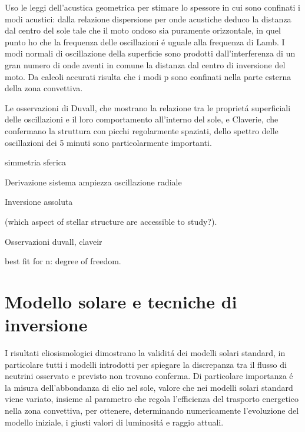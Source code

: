 \documentclass[../main.tex]{subfiles}
\begin{document}
Uso le leggi dell'acustica geometrica per stimare lo spessore in cui sono confinati i modi acustici: dalla relazione dispersione per onde acustiche deduco la distanza dal centro del sole tale che il moto ondoso sia puramente orizzontale, in quel punto ho che la frequenza delle oscillazioni \'e uguale alla frequenza di Lamb. I modi normali di oscillazione della superficie sono prodotti dall'interferenza di un gran numero di onde aventi in comune la distanza dal centro di inversione del moto. Da calcoli accurati risulta che i modi p sono confinati nella parte esterna della zona convettiva. 

Le osservazioni di Duvall, che mostrano la relazione tra le propriet\'a superficiali delle oscillazioni e il loro comportamento all'interno del sole, e Claverie, che confermano la struttura con picchi regolarmente spaziati, dello spettro delle oscillazioni dei 5 minuti sono particolarmente importanti.


\begin{itemize*}
\item simmetria sferica
\item Derivazione sistema ampiezza oscillazione radiale

\item Inversione assoluta
\item (which aspect of stellar structure are accessible to study?).
\item Osservazioni duvall, claveir \cite{duv82dispersion}
\item best fit for n: degree of freedom.
\end{itemize*}

\printbibliography[heading=subbibintoc]

\section{Modello solare e tecniche di inversione}


I risultati eliosismologici dimostrano la validit\'a dei modelli solari standard, in particolare tutti i modelli introdotti per spiegare la discrepanza tra il flusso di neutrini osservato e previsto non trovano conferma. Di particolare importanza \'e la  misura  dell'abbondanza di elio nel sole, valore che nei modelli solari standard viene variato, insieme al parametro che regola l'efficienza del trasporto energetico nella zona convettiva, per ottenere, determinando numericamente l'evoluzione del modello iniziale, i giusti valori di luminosit\'a e raggio attuali.
\end{document}

